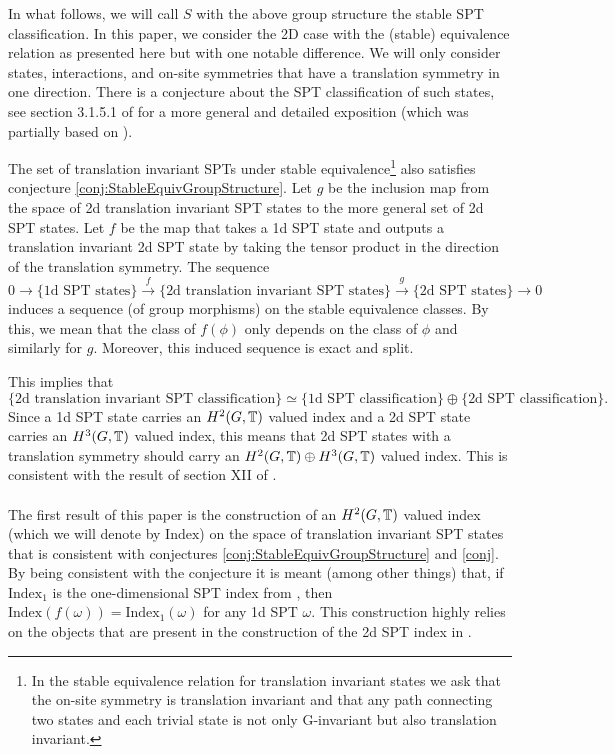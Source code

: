 \documentclass[11pt,a4paper,twoside]{article}
\numberwithin{equation}{section}
\begin{document}
	In what follows, we will call $S$ with the above group structure the stable SPT classification. In this paper, we consider the 2D case with the (stable) equivalence relation as presented here but with one notable difference. We will only consider states, interactions, and on-site symmetries that have a translation symmetry in one direction. There is a conjecture about the SPT classification of such states, see section 3.1.5.1 of \cite{xiong2019classification} for a more general and detailed exposition (which was partially based on \cite{Chen_2013}).
	\begin{conjecture}\label{conj}
		The set of translation invariant SPTs under stable equivalence\footnote{In the stable equivalence relation for translation invariant states we ask that the on-site symmetry is translation invariant and that any path connecting two states and each trivial state is not only G-invariant but also translation invariant.} also satisfies conjecture \ref{conj:StableEquivGroupStructure}. Let $g$ be the inclusion map from the space of 2d translation invariant SPT states to the more general set of 2d SPT states. Let $f$ be the map that takes a 1d SPT state and outputs a translation invariant 2d SPT state by taking the tensor product in the direction of the translation symmetry. The sequence
		\begin{equation}
			0\rightarrow\{\text{1d SPT states}\}\stackrel{f}{\rightarrow}\{\text{2d translation invariant SPT states}\}\stackrel{g}{\rightarrow}\{\text{2d SPT states}\}\rightarrow 0
		\end{equation}
		induces a sequence (of group morphisms) on the stable equivalence classes. By this, we mean that the class of $f(\phi)$ only depends on the class of $\phi$ and similarly for $g$. Moreover, this induced sequence is exact and split.
	\end{conjecture}
	This implies that
	\begin{equation}
		\{\text{2d translation invariant SPT classification}\}\simeq \{\text{1d SPT classification}\}\oplus \{\text{2d SPT classification}\}.
	\end{equation}
	Since a 1d SPT state carries an $H^2(G,\mathbb T)$ valued index and a 2d SPT state carries an $H^3(G,\mathbb T)$ valued index, this means that 2d SPT states with a translation symmetry should carry an $H^2(G,\mathbb T)\oplus H^3(G,\mathbb T)$ valued index. This is consistent with the result of section XII of \cite{Chen_2013}.
	\\\\
	The first result of this paper is the construction of an $H^2(G,\mathbb T)$ valued index (which we will denote by $\textrm{Index}$) on the space of translation invariant SPT states that is consistent with conjectures \ref{conj:StableEquivGroupStructure} and \ref{conj}. By being consistent with the conjecture it is meant (among other things) that, if $\textrm{Index}_1$ is the one-dimensional SPT index from \cite{ogata2019classification}, then $\textrm{Index}(f(\omega))=\textrm{Index}_1(\omega)$ for any 1d SPT $\omega$. This construction highly relies on the objects that are present in the construction of the 2d SPT index in \cite{ogata2021h3gmathbb}.
\end{document}
